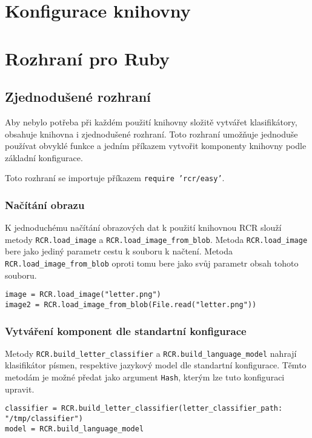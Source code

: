 \documentclass[a4paper]{article}
\begin{document}

\section{Konfigurace knihovny}

\section{Rozhraní pro Ruby}

\subsection{Zjednodušené rozhraní}
Aby nebylo potřeba při každém použití knihovny složitě vytvářet klasifikátory,
obsahuje knihovna i zjednodušené rozhraní. Toto rozhraní umožňuje jednoduše
používat obvyklé funkce a jedním příkazem vytvořit komponenty knihovny podle
základní konfigurace.

Toto rozhraní se importuje příkazem \texttt{require 'rcr/easy'}.

\subsubsection{Načítání obrazu}
K jednoduchému načítání obrazových dat k použití knihovnou RCR slouží metody
\texttt{RCR.load\_image} a \texttt{RCR.load\_image\_from\_blob}. Metoda
\texttt{RCR.load\_image} bere jako jediný parametr cestu k souboru k načtení.
Metoda \texttt{RCR.load\_image\_from\_blob} oproti tomu bere jako svůj parametr
obsah tohoto souboru.
\begin{lstlisting}
image = RCR.load_image("letter.png")
image2 = RCR.load_image_from_blob(File.read("letter.png"))
\end{lstlisting}

\subsubsection{Vytváření komponent dle standartní konfigurace}
Metody \texttt{RCR.build\_letter\_classifier} a
\texttt{RCR.build\_language\_model} nahrají klasifikátor písmen, respektive jazykový model
dle standartní konfigurace. Těmto metodám je možné předat jako argument
\texttt{Hash}, kterým lze tuto konfiguraci upravit.
\begin{lstlisting}
classifier = RCR.build_letter_classifier(letter_classifier_path: "/tmp/classifier")
model = RCR.build_language_model
\end{lstlisting}
\end{document}
